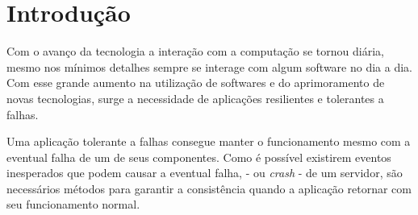 \documentclass[12pt,
openright, 
oneside,
a4paper,
brazil]{facom-ufu-abntex2}
\begin{document}
\imprimircapa
\imprimirfolhaderosto









\tableofcontents*
\cleardoublepage


\textual

\chapter{Introdução}

Com o avanço da tecnologia a interação com a computação se tornou diária, mesmo
nos mínimos detalhes sempre se interage com algum software no dia a dia. Com
esse grande aumento na utilização de softwares e do aprimoramento de novas tecnologias, 
surge a necessidade de aplicações resilientes e tolerantes a falhas. 

Uma aplicação tolerante a falhas consegue manter o funcionamento mesmo com a eventual 
falha de um de seus componentes. Como é possível existirem eventos inesperados que podem
causar a eventual falha, - ou \textit{crash} - de um servidor, são necessários métodos
para garantir a consistência quando a aplicação retornar com seu funcionamento
normal. 
\end{document}
